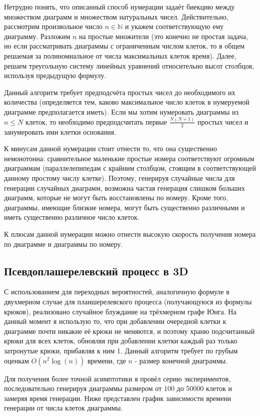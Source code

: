 \documentclass[12pt]{report}
\begin{document}
Нетрудно понять, что описанный способ нумерации задаёт биекцию между множеством диаграмм и множеством натуральных чисел. Действительно, рассмотрим произвольное число $n \in \mathbb{N}$ и укажем соответствующую ему диаграмму. Разложим $n$ на простые множители (это конечно не простая задача, но если рассматривать диаграммы с ограниченным числом клеток, то в общем решаемая за полиномиальное от числа максимальных клеток время). Далее, решаем треугольную систему линейных уравнений относительно высот столбцов, используя предыдущую формулу.

Данный алгоритм требует предподсчёта простых чисел до необходимого их количества (определяется тем, каково максимальное число клеток в нумеруемой диаграмме предполагается иметь). Если мы хотим нумеровать диаграммы из $n \leq N$ клеток, то необходимо предподсчитать первые $\frac{N(N+1)}{2}$ простых чисел и занумеровать ими клетки основания.

К минусам данной нумерации стоит отнести то, что она существенно немонотонна: сравнительное маленькие простые номера соответствуют огромным диаграммам (параллелепипедам с крайним столбцом, стоящим в соответствующей данному простому числу клетке). Поэтому, генерируя случайные числа для генерации случайных диаграмм, возможна частая генерация слишком больших диаграмм, которые не могут быть восстановлены по номеру. Кроме того, диаграммы, имеющие близкие номера, могут быть существенно различными и иметь существенно различное число клеток.

К плюсам данной нумерации можно отнести высокую скорость получения номера по диаграмме и диаграммы по номеру.

\subsection*{Псевдоплашерелевский процесс в 3D}
\hspace{\parindent}С использованием для переходных вероятностей, аналогичную формуле в двухмерном случае для планшерелевского процесса (получающуюся из формулы крюков), реализовано случайное блуждание на трёхмерном графе Юнга.
На данный момент я использую то, что при добавлении очередной клетки к диаграмме почти никакие её крюки не меняются, и поэтому храню подсчитанный крюки для всех клеток, обновляя при добавлении клетки каждый раз только затронутые крюки, прибавляя к ним 1. Данный алгоритм требует по грубым оценкам $O(n^2\log(n))$ времени, где $n$ - размер конечной диаграммы.

Для получения более точной асимптотики я провёл серию экспериментов, последовательно генерируя диаграммы размером от 100 до 50000 клеток и замеряя время генерации. Ниже представлен график зависимости времени генерации от числа клеток диаграммы.
\end{document}
